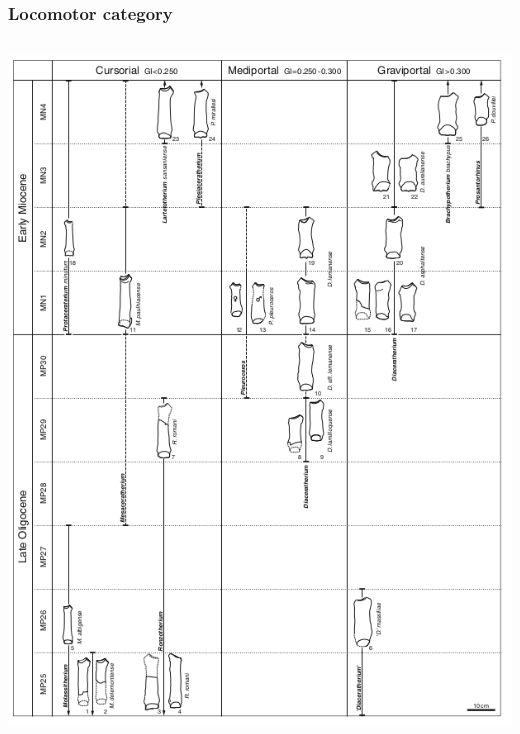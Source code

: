 \documentclass{beamer}
\begin{document}
\begin{frame}
  \frametitle{Locomotor category}

  \begin{columns}
    \begin{column}{0.5\textwidth}
      \includegraphics[height=0.8\textheight, width=\textwidth, keepaspectratio=true]{figure/scherler}


\end{column}
\end{columns}
\end{frame}
\end{document}

